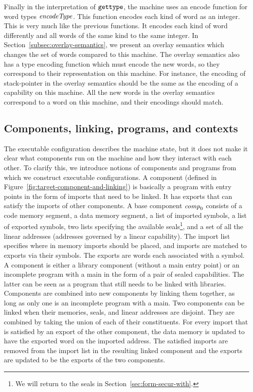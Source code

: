 \documentclass[acmsmall,screen]{acmart}\settopmatter{}
\renewcommand{\comp}{\var{comp}}
\newenvironment{jversion}%
    {\color{OliveGreen}}{}
\begin{document}
\begin{jversion}
Finally in the interpretation of $\tisptr{}{}$, the machine uses an encode function for word types $\encType{}$.
This function encodes each kind of word as an integer.
This is very much like the previous functions.
It encodes each kind of word differently and all words of the same kind to the same integer.
In Section~\ref{subsec:overlay-semantics}, we present an overlay semantics which changes the set of words compared to this machine.
The overlay semantics also has a type encoding function which must encode the new words, so they correspond to their representation on this machine.
For instance, the encoding of stack-pointer in the overlay semantics should be the same as the encoding of a capability on this machine.
All the new words in the overlay semantics correspond to a word on this machine, and their encodings should match.
\end{jversion}

\subsection{Components, linking, programs, and contexts }
\label{subsed:components-linking}
The executable configuration describes the machine state, but it does not make it clear what components run on the machine and how they interact with each other.
To clarify this, we introduce notions of components and programs from which we construct executable configurations.
A component (defined in Figure~\ref{fig:target-component-and-linking}) is basically a program with entry points in the form of imports that need to be linked.
It has exports that can satisfy the imports of other components.
A base component $\comp_0$ consists of a code memory segment, a data memory segment, a list of imported symbols, a list of exported symbols, two lists specifying the available seals\footnote{We will return to the seals in Section~\ref{sec:form-secur-with}.}, and a set of all the linear addresses (addresses governed by a linear capability).
The import list specifies where in memory imports should be placed, and imports are matched to exports via their symbols.
The exports are words each associated with a symbol.
A component is either a library component (without a main entry point) or an incomplete program with a main in the form of a pair of sealed capabilities.
The latter can be seen as a program that still needs to be linked with libraries.
Components are combined into new components by linking them together, as long as only one is an incomplete program with a main.
Two components can be linked when their memories, seals, and linear addresses are disjoint.
They are combined by taking the union of each of their constituents.
For every import that is satisfied by an export of the other component, the data memory is updated to have the exported word on the imported address.
The satisfied imports are removed from the import list in the resulting linked component and the exports are updated to be the exports of the two components.
\end{document}
